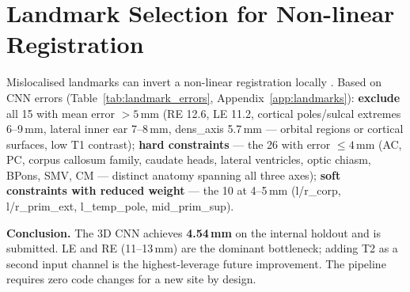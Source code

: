 \documentclass[11pt,letterpaper]{article}
\begin{document}
\section{Landmark Selection for Non-linear Registration}
\label{sec:landmark_selection}

Mislocalised landmarks can invert a non-linear registration locally \cite{rohlfing2012image}.
Based on CNN errors (Table~\ref{tab:landmark_errors}, Appendix~\ref{app:landmarks}):
\textbf{exclude} all 15 with mean error $>5$\,mm (RE 12.6, LE 11.2, cortical poles/sulcal extremes
6--9\,mm, lateral inner ear 7--8\,mm, dens\_axis 5.7\,mm — orbital regions or cortical surfaces,
low T1 contrast);
\textbf{hard constraints} — the 26 with error $\leq4$\,mm (AC, PC, corpus callosum family,
caudate heads, lateral ventricles, optic chiasm, BPons, SMV, CM — distinct anatomy spanning all
three axes);
\textbf{soft constraints with reduced weight} — the 10 at 4--5\,mm
(l/r\_corp, l/r\_prim\_ext, l\_temp\_pole, mid\_prim\_sup).

\textbf{Conclusion.}
The 3D CNN achieves \textbf{4.54\,mm} on the internal holdout and is submitted.
LE and RE (11--13\,mm) are the dominant bottleneck; adding T2 as a second input channel is the
highest-leverage future improvement.
The pipeline requires zero code changes for a new site by design.
\end{document}
